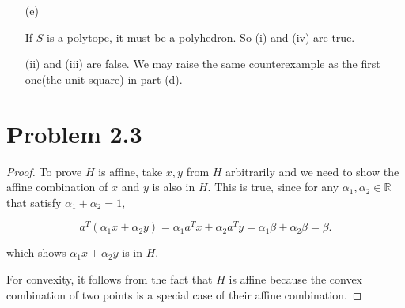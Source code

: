 \documentclass[12pt]{article}
\begin{document}
\begin{enumerate}
\begin{proof}
Take $x, y \in S$, and $\forall \alpha \in (0, 1)$, the convex combination of $x$ and $y$ is in $S$. This is true because 
$$
A(\alpha x + (1- \alpha) y) = \alpha Ax + (1-\alpha)Ay \leqslant \alpha b + (1-\alpha) b = b.
$$

Hence, $S$ is a convex set.

\end{proof}

For (ii) and (iii), they are false and we will give a counterexample in $\mathbb{R}^2$.

Let $S : = \{(x, y) | 0\leqslant x \leqslant 1, 0\leqslant y \leqslant 1 \}$. It is clear that $S$ is a polyhedron, but $S$ is neither affine nor a cone.

\vspace{50mm}

For (iv), it is false because we may give a unbounded polyhedron $S = \{(x, y) | x\geqslant 0, y\geqslant 0, x+y \geqslant 1\}$. And it is not a polytope.

\vspace{50mm}



\item[(e)]

If $S$ is a polytope, it must be a polyhedron. So (i) and (iv) are true. 

(ii) and (iii) are false. We may raise the same counterexample as the first one(the unit square) in part (d).





\end{enumerate}


\section*{Problem 2.3}

\begin{proof}

To prove $H$ is affine, take $x, y$ from $H$ arbitrarily and we need to show the affine combination of $x$ and $y$ is also in $H$. This is true, since for any $\alpha_1, \alpha_2 \in \mathbb{R}$ that satisfy $\alpha_1 + \alpha_2  =1$, 

$$
a^T(\alpha_1 x + \alpha_2 y) = \alpha_1 a^T x + \alpha_2 a^T y = \alpha_1\beta + \alpha_2 \beta = \beta.
$$

which shows $\alpha_1 x + \alpha_2 y$ is in $H$.

For convexity, it follows from the fact that $H$ is affine because the convex combination of two points is a special case of their affine combination.

\end{proof}
\end{document}
